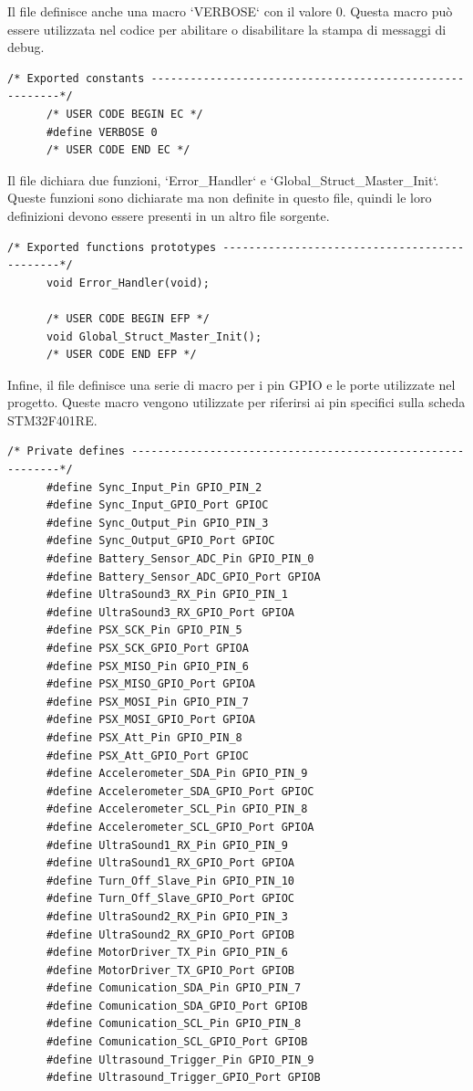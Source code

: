 \documentclass{article}
\begin{document}
      Il file definisce anche una macro `VERBOSE` con il valore 0. Questa macro può essere utilizzata nel codice per abilitare o disabilitare la stampa di messaggi di debug.

      \begin{lstlisting}[style=CStyle]
      /* Exported constants --------------------------------------------------------*/
      /* USER CODE BEGIN EC */
      #define VERBOSE 0
      /* USER CODE END EC */
      \end{lstlisting}

      Il file dichiara due funzioni, `Error\_Handler` e `Global\_Struct\_Master\_Init`. Queste funzioni sono dichiarate ma non definite in questo file, quindi le loro definizioni devono essere presenti in un altro file sorgente.

      \begin{lstlisting}[style=CStyle]
      /* Exported functions prototypes ---------------------------------------------*/
      void Error_Handler(void);

      /* USER CODE BEGIN EFP */
      void Global_Struct_Master_Init();
      /* USER CODE END EFP */
      \end{lstlisting}

      Infine, il file definisce una serie di macro per i pin GPIO e le porte utilizzate nel progetto. Queste macro vengono utilizzate per riferirsi ai pin specifici sulla scheda STM32F401RE.

      \begin{lstlisting}[style=CStyle]
      /* Private defines -----------------------------------------------------------*/
      #define Sync_Input_Pin GPIO_PIN_2
      #define Sync_Input_GPIO_Port GPIOC
      #define Sync_Output_Pin GPIO_PIN_3
      #define Sync_Output_GPIO_Port GPIOC
      #define Battery_Sensor_ADC_Pin GPIO_PIN_0
      #define Battery_Sensor_ADC_GPIO_Port GPIOA
      #define UltraSound3_RX_Pin GPIO_PIN_1
      #define UltraSound3_RX_GPIO_Port GPIOA
      #define PSX_SCK_Pin GPIO_PIN_5
      #define PSX_SCK_GPIO_Port GPIOA
      #define PSX_MISO_Pin GPIO_PIN_6
      #define PSX_MISO_GPIO_Port GPIOA
      #define PSX_MOSI_Pin GPIO_PIN_7
      #define PSX_MOSI_GPIO_Port GPIOA
      #define PSX_Att_Pin GPIO_PIN_8
      #define PSX_Att_GPIO_Port GPIOC
      #define Accelerometer_SDA_Pin GPIO_PIN_9
      #define Accelerometer_SDA_GPIO_Port GPIOC
      #define Accelerometer_SCL_Pin GPIO_PIN_8
      #define Accelerometer_SCL_GPIO_Port GPIOA
      #define UltraSound1_RX_Pin GPIO_PIN_9
      #define UltraSound1_RX_GPIO_Port GPIOA
      #define Turn_Off_Slave_Pin GPIO_PIN_10
      #define Turn_Off_Slave_GPIO_Port GPIOC
      #define UltraSound2_RX_Pin GPIO_PIN_3
      #define UltraSound2_RX_GPIO_Port GPIOB
      #define MotorDriver_TX_Pin GPIO_PIN_6
      #define MotorDriver_TX_GPIO_Port GPIOB
      #define Comunication_SDA_Pin GPIO_PIN_7
      #define Comunication_SDA_GPIO_Port GPIOB
      #define Comunication_SCL_Pin GPIO_PIN_8
      #define Comunication_SCL_GPIO_Port GPIOB
      #define Ultrasound_Trigger_Pin GPIO_PIN_9
      #define Ultrasound_Trigger_GPIO_Port GPIOB
      \end{lstlisting}
\end{document}
